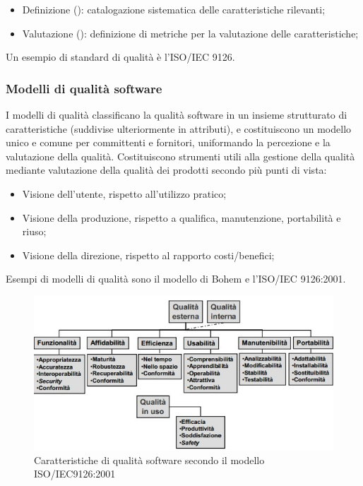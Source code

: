 \begin{itemize}
	\item Definizione (): catalogazione sistematica delle caratteristiche rilevanti;
	\item Valutazione (): definizione di metriche per la valutazione delle caratteristiche;
\end{itemize}

Un esempio di standard di qualità è l'ISO/IEC 9126.

\subsubsection{Modelli di qualità software}
I modelli di qualità classificano la qualità software in un insieme strutturato di caratteristiche (suddivise ulteriormente in attributi), e costituiscono un modello unico e comune per committenti e fornitori, uniformando la percezione e la valutazione della qualità. Costituiscono strumenti utili alla gestione della qualità mediante valutazione della qualità dei prodotti secondo più punti di vista:

\begin{itemize}
	\item Visione dell'utente, rispetto all'utilizzo pratico;
	\item Visione della produzione, rispetto a qualifica, manutenzione, portabilità e riuso;
	\item Visione della direzione, rispetto al rapporto costi/benefici;
\end{itemize}

Esempi di modelli di qualità sono il modello di Bohem e l'ISO/IEC 9126:2001.

\begin{figure}[h]
	\centering
	\includegraphics[scale=0.6]{imgs/isoiec_9126_2001.jpg}
	\caption{Caratteristiche di qualità software secondo il modello ISO/IEC9126:2001}
\end{figure}

